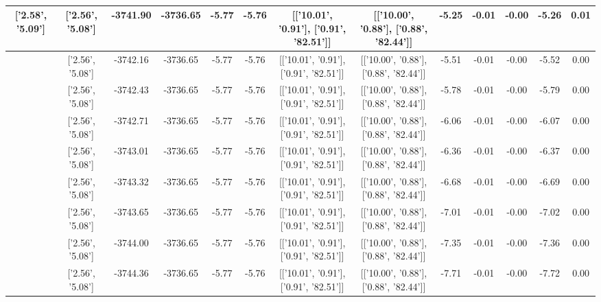 \begin{table}[htbp]
\begin{adjustbox}{angle=90}
\begin{tabular}{|c|c|c|c|c|c|c|c|c|c|c|c|c|}
 ['2.58', '5.09'] & ['2.56', '5.08'] & -3741.90 & -3736.65 & -5.77 & -5.76 & [['10.01', '0.91'], ['0.91', '82.51']] & [['10.00', '0.88'], ['0.88', '82.44']] & -5.25 & -0.01 & -0.00 & -5.26 & 0.01\\ \hline
 ['2.58', '5.09'] & ['2.56', '5.08'] & -3742.16 & -3736.65 & -5.77 & -5.76 & [['10.01', '0.91'], ['0.91', '82.51']] & [['10.00', '0.88'], ['0.88', '82.44']] & -5.51 & -0.01 & -0.00 & -5.52 & 0.00\\ \hline
 ['2.59', '5.09'] & ['2.56', '5.08'] & -3742.43 & -3736.65 & -5.77 & -5.76 & [['10.01', '0.91'], ['0.91', '82.51']] & [['10.00', '0.88'], ['0.88', '82.44']] & -5.78 & -0.01 & -0.00 & -5.79 & 0.00\\ \hline
 ['2.59', '5.09'] & ['2.56', '5.08'] & -3742.71 & -3736.65 & -5.77 & -5.76 & [['10.01', '0.91'], ['0.91', '82.51']] & [['10.00', '0.88'], ['0.88', '82.44']] & -6.06 & -0.01 & -0.00 & -6.07 & 0.00\\ \hline
 ['2.59', '5.09'] & ['2.56', '5.08'] & -3743.01 & -3736.65 & -5.77 & -5.76 & [['10.01', '0.91'], ['0.91', '82.51']] & [['10.00', '0.88'], ['0.88', '82.44']] & -6.36 & -0.01 & -0.00 & -6.37 & 0.00\\ \hline
 ['2.59', '5.09'] & ['2.56', '5.08'] & -3743.32 & -3736.65 & -5.77 & -5.76 & [['10.01', '0.91'], ['0.91', '82.51']] & [['10.00', '0.88'], ['0.88', '82.44']] & -6.68 & -0.01 & -0.00 & -6.69 & 0.00\\ \hline
 ['2.59', '5.09'] & ['2.56', '5.08'] & -3743.65 & -3736.65 & -5.77 & -5.76 & [['10.01', '0.91'], ['0.91', '82.51']] & [['10.00', '0.88'], ['0.88', '82.44']] & -7.01 & -0.01 & -0.00 & -7.02 & 0.00\\ \hline
 ['2.59', '5.09'] & ['2.56', '5.08'] & -3744.00 & -3736.65 & -5.77 & -5.76 & [['10.01', '0.91'], ['0.91', '82.51']] & [['10.00', '0.88'], ['0.88', '82.44']] & -7.35 & -0.01 & -0.00 & -7.36 & 0.00\\ \hline
 ['2.59', '5.09'] & ['2.56', '5.08'] & -3744.36 & -3736.65 & -5.77 & -5.76 & [['10.01', '0.91'], ['0.91', '82.51']] & [['10.00', '0.88'], ['0.88', '82.44']] & -7.71 & -0.01 & -0.00 & -7.72 & 0.00\\ \hline
            \end{tabular}
        \end{adjustbox}
        \caption{}
        \label{}
    \end{table}
    